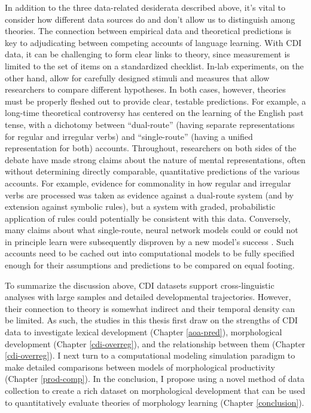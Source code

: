 \documentclass[
   11pt,
       ]{book}
\begin{document}
In addition to the three data-related desiderata described above, it's vital to consider how different data sources do and don't allow us to distinguish among theories. The connection between empirical data and theoretical predictions is key to adjudicating between competing accounts of language learning. With CDI data, it can be challenging to form clear links to theory, since measurement is limited to the set of items on a standardized checklist. In-lab experiments, on the other hand, allow for carefully designed stimuli and measures that allow researchers to compare different hypotheses. In both cases, however, theories must be properly fleshed out to provide clear, testable predictions. For example, a long-time theoretical controversy has centered on the learning of the English past tense, with a dichotomy between ``dual-route'' (having separate representations for regular and irregular verbs) and ``single-route'' (having a unified representation for both) accounts. Throughout, researchers on both sides of the debate have made strong claims about the nature of mental representations, often without determining directly comparable, quantitative predictions of the various accounts. For example, evidence for commonality in how regular and irregular verbs are processed was taken as evidence against a dual-route system (and by extension against symbolic rules), but a system with graded, probabilistic application of rules could potentially be consistent with this data. Conversely, many claims about what single-route, neural network models could or could not in principle learn were subsequently disproven by a new model's success \citep{macwhinney1991, plunkett1991, plunkett1993, westermann1995, hoeffner1996, nakisa1996, plunkett1997, plunkett1999, hahn2000}. Such accounts need to be cached out into computational models to be fully specified enough for their assumptions and predictions to be compared on equal footing.

To summarize the discussion above, CDI datasets support cross-linguistic analyses with large samples and detailed developmental trajectories. However, their connection to theory is somewhat indirect and their temporal density can be limited. As such, the studies in this thesis first draw on the strengths of CDI data to investigate lexical development (Chapter \ref{aoa-pred}), morphological development (Chapter \ref{cdi-overreg}), and the relationship between them (Chapter \ref{cdi-overreg}). I next turn to a computational modeling simulation paradigm to make detailed comparisons between models of morphological productivity (Chapter \ref{prod-comp}). In the conclusion, I propose using a novel method of data collection to create a rich dataset on morphological development that can be used to quantitatively evaluate theories of morphology learning (Chapter \ref{conclusion}).
\end{document}
